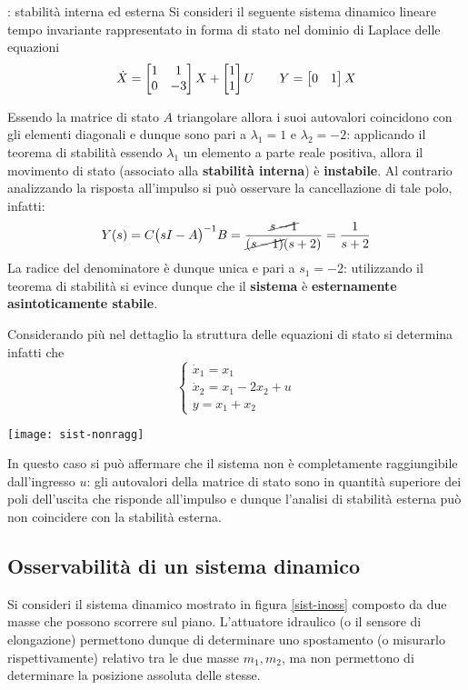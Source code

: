 		\begin{esempio}{: stabilità interna ed esterna}
			Si consideri il seguente sistema dinamico lineare tempo invariante rappresentato in forma di stato nel dominio di Laplace delle equazioni
			\[ \dot X= \begin{bmatrix} 1 & 1 \\ 0 & -3 \end{bmatrix} X + \begin{bmatrix} 1 \\ 1 \end{bmatrix}U \qquad Y = \begin{bmatrix} 0 & 1 \end{bmatrix} X \]
			
			Essendo la matrice di stato $A$ triangolare allora i suoi autovalori coincidono con gli elementi diagonali e dunque sono pari a $\lambda_1 = 1$ e $\lambda_2 = -2$: applicando il teorema di stabilità essendo $\lambda_1$ un elemento a parte reale positiva, allora il movimento di stato (associato alla \textbf{stabilità interna}) è \textbf{instabile}. Al contrario analizzando la risposta all'impulso si può osservare la cancellazione di tale polo, infatti:
			\[ Y(s) = C \big(sI-A\big)^{-1}B = \frac{\cancel{s-1}}{\cancel{(s-1)}(s+2)} = \frac 1 {s+2} \] 
			La radice del denominatore è dunque unica e pari a $s_1 = -2$: utilizzando il teorema di stabilità si evince dunque che il \textbf{sistema} è \textbf{esternamente asintoticamente stabile}.
			
			\vspace{3mm}
			Considerando più nel dettaglio la struttura delle equazioni di stato si determina infatti che
			\[ \begin{cases}
				\dot x_1 = x_1 \\ \dot x_2 = x_1-2x_2 + u \\ y = x_1 + x_2
			\end{cases} \]
			\begin{center}
				\texttt{[image: sist-nonragg]}
			\end{center}
			In questo caso si può affermare che il sistema non è completamente raggiungibile dall'ingresso $u$: gli autovalori della matrice di stato sono in quantità superiore dei poli dell'uscita che risponde all'impulso e dunque l'analisi di stabilità esterna può non coincidere con la stabilità esterna.
			
		\end{esempio}
	
	\subsection{Osservabilità di un sistema dinamico}
		Si consideri il sistema dinamico mostrato in figura \ref{sist-inoss} composto da due masse che possono scorrere sul piano. L'attuatore idraulico (o il sensore di elongazione) permettono dunque di determinare uno spostamento (o misurarlo rispettivamente) relativo tra le due masse $m_1,m_2$, ma non permettono di determinare la posizione assoluta delle stesse.	
	
